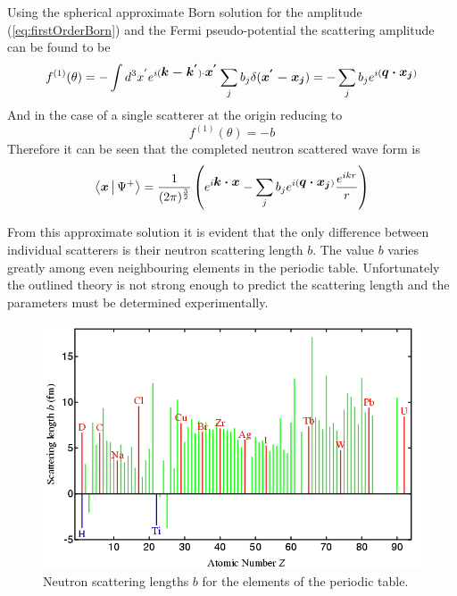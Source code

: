Using the spherical approximate Born solution for the amplitude (\ref{eq:firstOrderBorn}) and the Fermi pseudo-potential the scattering amplitude can be found to be 
\begin{equation}
f^{(1)}(\theta) = -\int d^3x^{'}e^{i(\mbox{\boldmath$k-k^{'}$})\cdot \mbox{\boldmath$x^{'}$}}\sum\limits_{j} b_j \delta(\mbox{\boldmath$x^{'}-x_j$})=-\sum\limits_{j}b_j e^{i(\mbox{\boldmath$q \cdot x_j$})}
\label{eq:neutronScatteringAmplitude}
\end{equation}
And in the case of a single scatterer at the origin reducing to 
\begin{equation}
f^{(1)}(\theta)  = -b
\label{eq:neutronScatteringSingle}
\end{equation}
Therefore it can be seen that the completed neutron scattered wave form is
\begin{equation}
\label{eq:scatterNeutronWaveForm}
\Braket{\mbox{\boldmath$x$}|\Psi^{+}} = \frac{1}{(2\pi)^{\frac{3}{2}}}\left(e^{i\mbox{\boldmath$k \cdot x$}} - \sum\limits_{j}b_j e^{i(\mbox{\boldmath$q \cdot x_j$})}\frac{e^{ikr}}{r}\right)
\end{equation}

From this approximate solution it is evident that the only difference between individual scatterers is their neutron scattering length $b$. The value $b$ varies greatly among even neighbouring elements in the periodic table. Unfortunately the outlined theory is not strong enough to predict the scattering length and the parameters must be determined experimentally. 

\begin{figure}[ht!]
\centering
\includegraphics[scale=0.5]{Figures/neutronScatteringLength.png}
\caption{Neutron scattering lengths $b$ for the elements of the periodic table. \cite{scatteringlengths}}
\label{fig:scatteringLength}
\end{figure}

